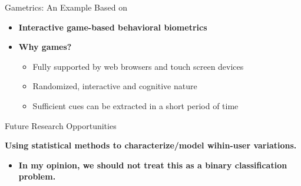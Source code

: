 \documentclass[aspectratio=43]{beamer}
\begin{document}
\begin{frame}{Gametrics: An Example Based on \cite{mohamed2016gametrics}}
    \begin{itemize}
        \item \textbf{Interactive game-based behavioral biometrics}
        \item \textbf{Why games?}
        \begin{itemize}
            	\item Fully supported by web browsers and touch screen devices
            	\item Randomized, interactive and cognitive nature
            	\item Sufficient cues can be extracted in a short period of time 
        \end{itemize}
    \end{itemize}
    
    
    \begin{center}
    \end{center}

\end{frame}




\begin{frame}{Future Research Opportunities}

\begin{eBox}
   \textbf{Using statistical methods to characterize/model wihin-user variations.} 
   
   \begin{itemize}
       \item \textbf{In my opinion, we should not treat this as a binary classification problem.}
   \end{itemize}
\end{eBox}


\end{frame}
\end{document}

